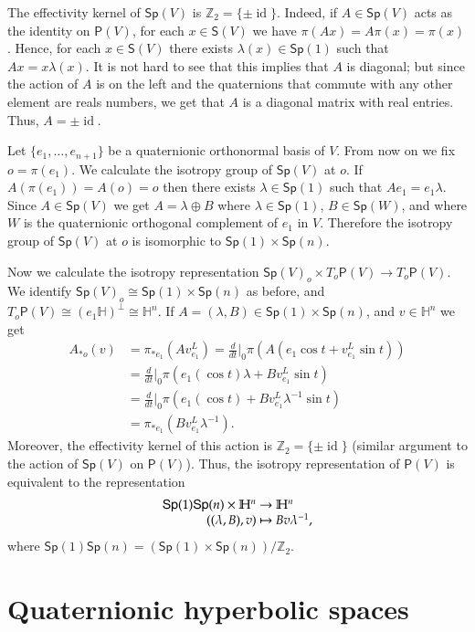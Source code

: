 \documentclass[12pt, a4paper]{amsart}
\newcommand{\id}{\operatorname{id}}
\renewcommand{\H}{\mathbb{H}}
\newcommand{\Sp}{\mathsf{Sp}}
\theoremstyle{remark}
\begin{document}
The effectivity kernel of $\Sp(V)$ is $\mathbb{Z}_2=\{\pm \id\}$.
Indeed, if $A\in\Sp(V)$ acts as the identity on $\mathsf{P}(V)$, for each $x\in\mathsf{S}(V)$ we have 
$\pi(Ax)=A\pi(x)=\pi(x)$.
Hence, for each $x\in\mathsf{S}(V)$ there exists $\lambda(x)\in\Sp(1)$ such that $Ax=x\lambda(x)$.
It is not hard to see that this implies that $A$ is diagonal;
but since the action of $A$ is on the left and the quaternions that commute with any other element are reals numbers, we get that $A$ is a diagonal matrix with real entries.
Thus, $A=\pm\id$.

Let $\{e_1,\dots,e_{n+1}\}$ be a quaternionic orthonormal basis of $V$.
From now on we fix $o=\pi(e_1)$.
We calculate the isotropy group of $\Sp(V)$ at $o$.
If $A(\pi(e_1))=A(o)=o$ then there exists $\lambda\in\Sp(1)$ such that $Ae_1=e_1\lambda$.
Since $A\in\Sp(V)$ we get $A=\lambda\oplus B$ where $\lambda\in\Sp(1)$, $B\in\Sp(W)$, and where $W$ is the quaternionic orthogonal complement of $e_1$ in $V$.
Therefore the isotropy group of $\Sp(V)$ at $o$ is isomorphic to $\Sp(1)\times\Sp(n)$.

Now we calculate the isotropy representation $\Sp(V)_o\times T_o\mathsf{P}(V)\to T_o\mathsf{P}(V)$.
We identify $\Sp(V)_o\cong \Sp(1)\times\Sp(n)$ as before, and $T_o\mathsf{P}(V)\cong(e_1\H)^\perp\cong\H^{n}$.
If $A=(\lambda,B)\in\Sp(1)\times\Sp(n)$, and $v\in\H^n$ we get
\[
\begin{aligned}
A_{*o}(v)
&{}=\pi_{*e_1}(Av_{e_1}^L)
=\frac{d}{dt}\Big\vert_0 \pi(A(e_1\cos t+v_{e_1}^L\sin t))\\
&{}=\frac{d}{dt}\Big\vert_0 \pi(e_1(\cos t) \lambda+B v_{e_1}^L\sin t)\\
&{}=\frac{d}{dt}\Big\vert_0 \pi(e_1(\cos t)+B v_{e_1}^L\lambda^{-1}\sin t)\\[1ex]
&{}=\pi_{*e_1}(Bv_{e_1}^L\lambda^{-1}).
\end{aligned}
\]
Moreover, the effectivity kernel of this action is $\mathbb{Z}_2=\{\pm\id\}$ (similar argument to the action of $\Sp(V)$ on $\mathsf{P}(V)$).
Thus, the isotropy representation of $\mathsf{P}(V)$ is equivalent to the representation
\[
\begin{array}{r@{\ }c@{\ }l}
\Sp(1)\Sp(n)\times\H^n & \to & \H^n\\
((\lambda,B),v) & \mapsto & Bv\lambda^{-1},
\end{array}
\]
where $\Sp(1)\Sp(n)=(\Sp(1)\times\Sp(n))/\mathbb{Z}_2$.


\section{Quaternionic hyperbolic spaces}
\end{document}
